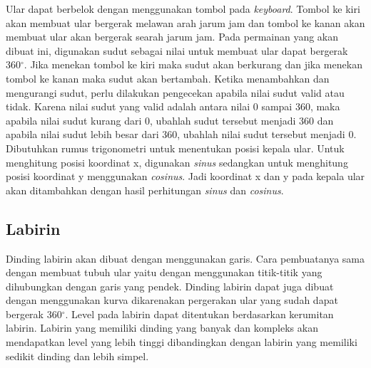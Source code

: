 Ular dapat berbelok dengan menggunakan tombol pada \textit{keyboard}. Tombol ke kiri akan membuat ular bergerak melawan arah jarum jam dan tombol ke kanan akan membuat ular akan bergerak searah jarum jam. Pada permainan yang akan dibuat ini, digunakan sudut sebagai nilai untuk membuat ular dapat bergerak 360$^\circ$. Jika menekan tombol ke kiri maka sudut akan berkurang dan jika menekan tombol ke kanan maka sudut akan bertambah. Ketika menambahkan dan mengurangi sudut, perlu dilakukan pengecekan apabila nilai sudut valid atau tidak. Karena nilai sudut yang valid adalah antara nilai 0 sampai 360, maka apabila nilai sudut kurang dari 0, ubahlah sudut tersebut menjadi 360 dan apabila nilai sudut lebih besar dari 360, ubahlah nilai sudut tersebut menjadi 0. Dibutuhkan rumus trigonometri untuk menentukan posisi kepala ular. Untuk menghitung posisi koordinat x, digunakan \textit{sinus} sedangkan untuk menghitung posisi koordinat y menggunakan \textit{cosinus}. Jadi koordinat x dan y pada kepala ular akan ditambahkan dengan hasil perhitungan \textit{sinus} dan \textit{cosinus}.

\subsection{Labirin}
Dinding labirin akan dibuat dengan menggunakan garis. Cara pembuatanya sama dengan membuat tubuh ular yaitu dengan menggunakan titik-titik yang dihubungkan dengan garis yang pendek. Dinding labirin dapat juga dibuat dengan menggunakan kurva dikarenakan pergerakan ular yang sudah dapat bergerak 360$^\circ$. Level pada labirin dapat ditentukan berdasarkan kerumitan labirin. Labirin yang memiliki dinding yang banyak dan kompleks akan mendapatkan level yang lebih tinggi dibandingkan dengan labirin yang memiliki sedikit dinding dan lebih simpel. 

